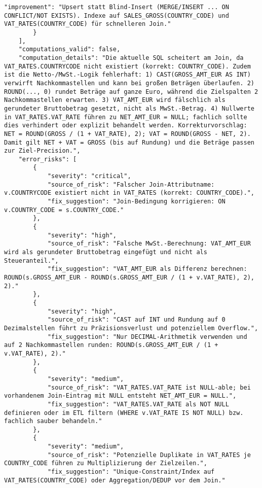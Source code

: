 \begin{lstlisting}[caption={Ausgabe: GPT-5 Anwendungsfall 5 Robustheitsdurchlauf},label={gpt_case5_prompt3}]
            "improvement": "Upsert statt Blind-Insert (MERGE/INSERT ... ON CONFLICT/NOT EXISTS). Indexe auf SALES_GROSS(COUNTRY_CODE) und VAT_RATES(COUNTRY_CODE) für schnelleren Join."
        }
    ],
    "computations_valid": false,
    "computation_details": "Die aktuelle SQL scheitert am Join, da VAT_RATES.COUNTRYCODE nicht existiert (korrekt: COUNTRY_CODE). Zudem ist die Netto-/MwSt.-Logik fehlerhaft: 1) CAST(GROSS_AMT_EUR AS INT) verwirft Nachkommastellen und kann bei großen Beträgen überlaufen. 2) ROUND(..., 0) rundet Beträge auf ganze Euro, während die Zielspalten 2 Nachkommastellen erwarten. 3) VAT_AMT_EUR wird fälschlich als gerundeter Bruttobetrag gesetzt, nicht als MwSt.-Betrag. 4) Nullwerte in VAT_RATES.VAT_RATE führen zu NET_AMT_EUR = NULL; fachlich sollte dies verhindert oder explizit behandelt werden. Korrekturvorschlag: NET = ROUND(GROSS / (1 + VAT_RATE), 2); VAT = ROUND(GROSS - NET, 2). Damit gilt NET + VAT = GROSS (bis auf Rundung) und die Beträge passen zur Ziel-Precision.",
    "error_risks": [
        {
            "severity": "critical",
            "source_of_risk": "Falscher Join-Attributname: v.COUNTRYCODE existiert nicht in VAT_RATES (korrekt: COUNTRY_CODE).",
            "fix_suggestion": "Join-Bedingung korrigieren: ON v.COUNTRY_CODE = s.COUNTRY_CODE."
        },
        {
            "severity": "high",
            "source_of_risk": "Falsche MwSt.-Berechnung: VAT_AMT_EUR wird als gerundeter Bruttobetrag eingefügt und nicht als Steueranteil.",
            "fix_suggestion": "VAT_AMT_EUR als Differenz berechnen: ROUND(s.GROSS_AMT_EUR - ROUND(s.GROSS_AMT_EUR / (1 + v.VAT_RATE), 2), 2)."
        },
        {
            "severity": "high",
            "source_of_risk": "CAST auf INT und Rundung auf 0 Dezimalstellen führt zu Präzisionsverlust und potenziellem Overflow.",
            "fix_suggestion": "Nur DECIMAL-Arithmetik verwenden und auf 2 Nachkommastellen runden: ROUND(s.GROSS_AMT_EUR / (1 + v.VAT_RATE), 2)."
        },
        {
            "severity": "medium",
            "source_of_risk": "VAT_RATES.VAT_RATE ist NULL-able; bei vorhandenem Join-Eintrag mit NULL entsteht NET_AMT_EUR = NULL.",
            "fix_suggestion": "VAT_RATES.VAT_RATE als NOT NULL definieren oder im ETL filtern (WHERE v.VAT_RATE IS NOT NULL) bzw. fachlich sauber behandeln."
        },
        {
            "severity": "medium",
            "source_of_risk": "Potenzielle Duplikate in VAT_RATES je COUNTRY_CODE führen zu Multiplizierung der Zielzeilen.",
            "fix_suggestion": "Unique-Constraint/Index auf VAT_RATES(COUNTRY_CODE) oder Aggregation/DEDUP vor dem Join."

\end{lstlisting}

